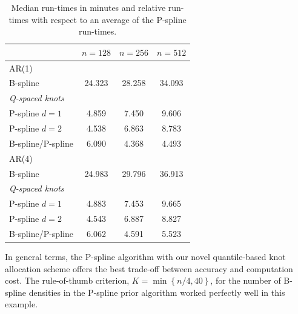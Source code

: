 \documentclass[twocolumn,final]{svjour3}
\begin{document}
\begin{table}
	\centering
		\begin{tabular}{lccc}
			\toprule
			& $n=128$ & $n=256$ & $n=512$ \\ \hline
			AR(1)     &  &  &  \\ 
			B-spline &   24.323 & 28.258 & 34.093 \\
			\textit{Q-spaced knots}& & &   \\
			\hspace{0.5em}P-spline $d=1$&  4.859 & 7.450 & 9.606\\
			\hspace{0.5em}P-spline $d=2$&  4.538 & 6.863 & 8.783\\
			B-spline/P-spline &  6.090 & 4.368 & 4.493 \\ \hline
			AR(4)     &  &  & \\ 
			B-spline & 24.983 & 29.796 & 36.913  \\
			\textit{Q-spaced knots}& & &   \\
			\hspace{0.5em}P-spline $d=1$ & 4.883 & 7.453 & 9.665 \\
			\hspace{0.5em}P-spline $d=2$& 4.543 & 6.887 & 8.827 \\
			B-spline/P-spline & 6.062 & 4.591 & 5.523 \\	
			\bottomrule
		\end{tabular}
	\caption{Median run-times in minutes and relative run-times with respect to an average of the P-spline run-times.}
	\label{table:sim_time}
\end{table}


In general terms, the P-spline algorithm with our novel quantile-based  knot allocation scheme offers the best trade-off between accuracy and computation cost.  The  rule-of-thumb criterion,  $K=\min\left\{n/4, 40\right\}$, for the number of B-spline densities in the P-spline prior algorithm worked perfectly well in this example. 

\end{document}
